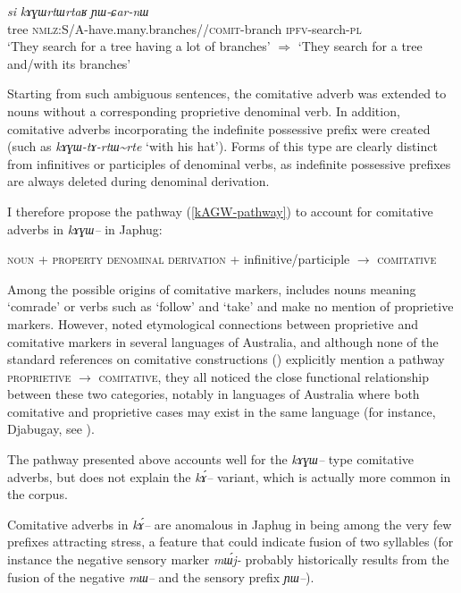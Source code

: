 \documentclass[oldfontcommands,oneside,a4paper,11pt]{article}
\newcommand{\ipa}[1]{{\phon\textit{#1}}} %
\newcommand{\tld}{\textasciitilde{}}
\begin{document}
  \begin{exe}
\ex \label{ex:kAGWrtWrtaR2}
\gll   
  \ipa{si} 	\ipa{kɤɣɯrtɯrtaʁ} \ipa{ɲɯ-ɕar-nɯ} \\
  tree \textsc{nmlz}:S/A-have.many.branches//\textsc{comit}-branch \textsc{ipfv}-search-\textsc{pl} \\
\glt `They search for a tree having a lot of branches' $\Rightarrow$ `They search for a tree and/with its branches'
\end{exe}

Starting from such ambiguous sentences, the comitative adverb was extended to nouns without a corresponding proprietive denominal verb. In addition, comitative adverbs incorporating the indefinite possessive prefix were created (such as \ipa{kɤɣɯ-tɤ-rtɯ\tld{}rte} `with his hat'). Forms of this type are clearly distinct from infinitives or participles of denominal verbs, as indefinite possessive prefixes are always deleted during  denominal derivation.


I therefore propose the pathway (\ref{kAGW-pathway}) to account for comitative adverbs in \ipa{kɤɣɯ--} in Japhug:

 \begin{exe}
\ex \label{kAGW-pathway}
 \glt  \textsc{noun} + \textsc{property denominal derivation} + infinitive/participle $\rightarrow$ \textsc{comitative}
\end{exe} 

Among the possible origins of comitative markers,  \citet[91, 139, 287]{heine-kuteva02} includes nouns meaning `comrade' or verbs such as `follow' and `take' and make no mention of proprietive markers. However, \citet{sutton76having} noted etymological connections between proprietive and comitative markers in several languages of Australia, and although none of the standard references on comitative constructions (\citealt{stassen00and, stolz06comitative, arkhipov09comitative}) explicitly mention a pathway \textsc{proprietive} $\rightarrow$ \textsc{comitative}, they all noticed the close functional relationship between these two categories, notably in languages of Australia where both comitative and proprietive cases may exist in the same language (for instance, Djabugay, see \citealt{patz91djabugay}).
 

The pathway presented above accounts well for the \ipa{kɤɣɯ--} type comitative adverbs, but does not explain the \ipa{kɤ́--} variant, which is actually more common in the corpus.

Comitative adverbs in \ipa{kɤ́--} are anomalous in Japhug in being among the very few prefixes attracting stress, a feature that could indicate fusion of two syllables (for instance the negative sensory marker \ipa{mɯ́j-} probably historically results from the fusion of the negative \ipa{mɯ--} and the sensory prefix \ipa{ɲɯ--}).
\end{document}
